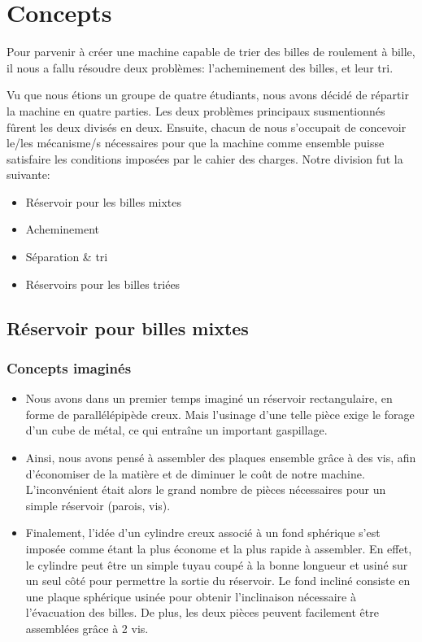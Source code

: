 \chapter{Concepts}
Pour parvenir à créer une machine capable de trier des billes de roulement à bille, il nous a fallu résoudre deux problèmes: l'acheminement des billes, et leur tri.


Vu que nous étions un groupe de quatre étudiants, nous avons décidé de répartir la machine en quatre parties. Les deux problèmes principaux susmentionnés fûrent les deux divisés en deux. Ensuite, chacun de nous s'occupait de concevoir le/les mécanisme/s nécessaires pour que la machine comme ensemble puisse satisfaire les conditions imposées par le cahier des charges. Notre division fut la suivante:
\begin{itemize}
    \item Réservoir pour les billes mixtes
    \item Acheminement
    \item Séparation \& tri
    \item Réservoirs pour les billes triées
\end{itemize}

\section{Réservoir pour billes mixtes}

\subsection{Concepts imaginés}
\begin{itemize}
    \item Nous avons dans un premier temps imaginé un réservoir rectangulaire, en forme de parallélépipède creux. Mais l’usinage d’une telle pièce exige le forage d’un cube de métal, ce qui entraîne un important gaspillage. 
    \item Ainsi, nous avons pensé à assembler des plaques ensemble grâce à des vis, afin d’économiser de la matière et de diminuer le coût de notre machine. L'inconvénient était alors le grand nombre de pièces nécessaires pour un simple réservoir (parois, vis). 
    \item Finalement, l’idée d’un cylindre creux associé à un fond sphérique s’est imposée comme étant la plus économe et la plus rapide à assembler. En effet, le cylindre peut être un simple tuyau coupé à la bonne longueur et usiné sur un seul côté pour permettre la sortie du réservoir. Le fond incliné consiste en une plaque sphérique usinée pour obtenir l'inclinaison nécessaire à l'évacuation des billes. De plus, les deux pièces peuvent facilement être assemblées grâce à 2 vis.
\end{itemize}

